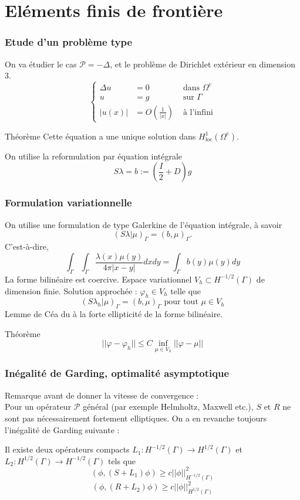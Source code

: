 \documentclass[11pt]{beamer}
\begin{document}
	\section{Eléments finis de frontière}
	\setcounter{subsection}{1}
	\begin{frame}
		\frametitle{Etude d'un problème type}
		On va étudier le cas $\mathcal{P} = - \Delta$, et le problème de Dirichlet extérieur en dimension $3$. 
		\[\left\{ \begin{array}{rll}
		\Delta u &= 0 &\text{ dans } \Omega^e\\
		u &= g &\text{ sur } \Gamma\\
		|u(x)| &= O(\frac{1}{|x|})& \text{ à l'infini} 
		\end{array}\right.\]
		\begin{block}{Théorème}
			Cette équation a une unique solution dans $H^1_{\text{loc}}(\Omega^e)$. 
		\end{block}
		On utilise la reformulation par équation intégrale 
		\[S\lambda = b := \left(\frac{I}{2} + D\right)g\]
	\end{frame}
	\begin{frame}
		\frametitle{Formulation variationnelle}
		On utilise une formulation de type Galerkine de l'équation intégrale, à savoir 
		\[\left( S\lambda| \mu \right)_{\Gamma} = (b,\mu)_{\Gamma}.\]
		C'est-à-dire, 
		\[\int_{\Gamma}\int_{\Gamma}\dfrac{\lambda(x) \mu(y)}{4\pi|x - y|} dxdy = \int_{\Gamma} b(y) \mu(y) dy\]
		La forme bilinéaire est coercive. Espace variationnel $V_h \subset H^{-1/2}(\Gamma)$ de dimension finie. 
		Solution approchée : $\varphi_h \in V_h$ telle que
		\[\left( S\lambda_h| \mu \right)_{\Gamma} = (b,\mu)_{\Gamma} \text{ pour tout } \mu \in V_h\]
		Lemme de Céa du à la forte ellipticité de la forme bilinéaire. 
		\begin{block}{Théorème}
			\[ || \varphi - \varphi_h|| \leq C \inf_{\mu \in V_h}||\varphi - \mu||\]
		\end{block} 	
	\end{frame}
	\begin{frame}
		\frametitle{Inégalité de Garding, optimalité asymptotique}
		Remarque avant de donner la vitesse de convergence :\\
		Pour un opérateur $\mathcal{P}$ général (par exemple Helmholtz, Maxwell etc.), $S$ et $R$ ne sont pas nécessairement fortement elliptiques. On a en revanche toujours l'inégalité de Garding suivante : 
		\begin{Theorem}
			Il existe deux opérateurs compacts $L_1 : H^{-1/2}(\Gamma) \to H^{1/2}(\Gamma)$ et $L_2 : H^{1/2}(\Gamma) \to H^{-1/2}(\Gamma)$ tels que
			\[(\phi,(S + L_1)\phi) \geq c||\phi||_{H^{-1/2}(\Gamma)}^2\] 
			\[(\phi,(R + L_2)\phi) \geq c||\phi||_{H^{1/2}(\Gamma)}^2\] 
		\end{Theorem} 
	\end{frame}
\end{document}
